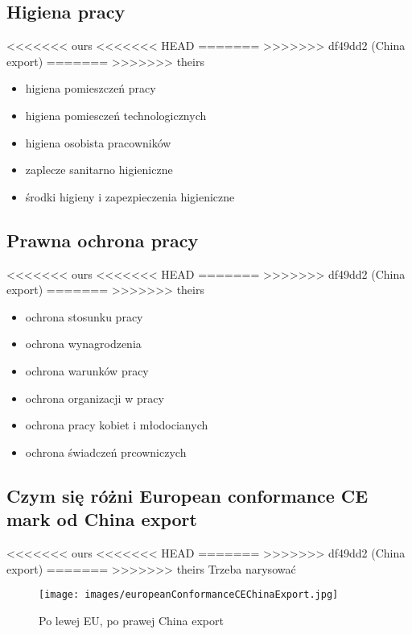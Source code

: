 \documentclass[11pt]{article}
\begin{document}
\subsection{Higiena pracy}
<<<<<<< ours
<<<<<<< HEAD
\label{sec:orgca11f3c}
=======
\label{sec:org1f47017}
>>>>>>> df49dd2 (China export)
=======
\label{sec:org1f47017}
>>>>>>> theirs
\begin{itemize}
\item higiena pomieszczeń pracy
\item higiena pomiesczeń technologicznych
\item higiena osobista pracowników
\item zaplecze sanitarno higieniczne
\item środki higieny i zapezpieczenia higieniczne
\end{itemize}
\subsection{Prawna ochrona pracy}
<<<<<<< ours
<<<<<<< HEAD
\label{sec:org0bd9350}
=======
\label{sec:org27905ed}
>>>>>>> df49dd2 (China export)
=======
\label{sec:org27905ed}
>>>>>>> theirs
\begin{itemize}
\item ochrona stosunku pracy
\item ochrona wynagrodzenia
\item ochrona warunków pracy
\item ochrona organizacji w pracy
\item ochrona pracy kobiet i młodocianych
\item ochrona świadczeń prcowniczych
\end{itemize}
\subsection{Czym się różni European conformance CE mark od China export}
<<<<<<< ours
<<<<<<< HEAD
\label{sec:org2fa742e}
=======
\label{sec:orgc31d2b5}
>>>>>>> df49dd2 (China export)
=======
\label{sec:orgc31d2b5}
>>>>>>> theirs
Trzeba narysować
\begin{figure}[htbp]
\centering
\texttt{[image: images/europeanConformanceCEChinaExport.jpg]}
\caption{Po lewej EU, po prawej China export}
\end{figure}
\end{document}
